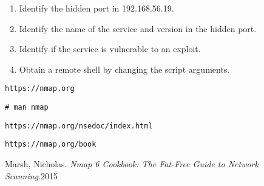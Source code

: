 \documentclass[twocolumn]{article}
\begin{document}
\begin{enumerate}
    \item Identify the hidden port in 192.168.56.19.
    \item Identify the name of the service and version in the hidden port.
    \item Identify if the service is vulnerable to an exploit.
    \item Obtain a remote shell by changing the script arguments.
\end{enumerate}

\begin{thebibliography}{9}

    
    \texttt{https://nmap.org}

    \texttt{\# man nmap}

    \texttt{https://nmap.org/nsedoc/index.html}

    \texttt{https://nmap.org/book}

    Marsh, Nicholas. \textit{Nmap 6 Cookbook: The Fat-Free Guide to Network Scanning}.2015

\end{thebibliography}
\end{document}

